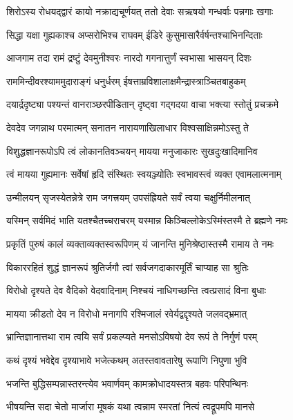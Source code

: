 \twolineshloka
{शिरोऽस्य रोधयद्द्वारं कायो नक्राद्यचूर्णयत्}
{ततो देवाः सऋषयो गन्धर्वाः पन्नगाः खगाः} %

\twolineshloka
{सिद्धा यक्षा गुह्यकाश्च अप्सरोभिश्च राघवम्}
{ईडिरे कुसुमासारैर्वर्षन्तश्चाभिनन्दिताः} %

\twolineshloka
{आजगाम तदा रामं द्रष्टुं देवमुनीश्वरः}
{नारदो गगनात्तुर्णं स्वभासा भासयन् दिशः} %

\twolineshloka
{राममिन्दीवरश्याममुदाराङ्गं धनुर्धरम्}
{ईषत्ताम्रविशालाक्षमैन्द्रास्त्राञ्चितबाहुकम्} %

\twolineshloka
{दयार्द्रदृष्ट्या पश्यन्तं वानराञ्छरपीडितान्}
{दृष्ट्वा गद्गदया वाचा भक्त्या स्तोतुं प्रचक्रमे} %


\twolineshloka
{देवदेव जगन्नाथ परमात्मन् सनातन}
{नारायणाखिलाधार विश्वसाक्षिन्नमोऽस्तु ते} %

\twolineshloka
{विशुद्धज्ञानरूपोऽपि त्वं लोकानतिवञ्चयन्}
{मायया मनुजाकारः सुखदुःखादिमानिव} %

\twolineshloka
{त्वं मायया गुह्यमानः सर्वेषां हृदि संस्थितः}
{स्वयञ्ज्योतिः स्वभावस्त्वं व्यक्त एवामलात्मनाम्} %

\twolineshloka
{उन्मीलयन् सृजस्येतन्नेत्रे राम जगत्त्रयम्}
{उपसंह्रियते सर्वं त्वया चक्षुर्निमीलनात्} %

\twolineshloka
{यस्मिन् सर्वमिदं भाति यतश्चैतच्चराचरम्}
{यस्मान्न किञ्चिल्लोकेऽस्मिंस्तस्मै ते ब्रह्मणे नमः} %

\twolineshloka
{प्रकृतिं पुरुषं कालं व्यक्ताव्यक्तस्वरूपिणम्}
{यं जानन्ति मुनिश्रेष्ठास्तस्मै रामाय ते नमः} %

\twolineshloka
{विकाररहितं शुद्धं ज्ञानरूपं श्रुतिर्जगौ}
{त्वां सर्वजगदाकारमूर्तिं चाप्याह सा श्रुतिः} %

\twolineshloka
{विरोधो दृश्यते देव वैदिको वेदवादिनाम्}
{निश्चयं नाधिगच्छन्ति त्वत्प्रसादं विना बुधाः} %

\twolineshloka
{मायया क्रीडतो देव न विरोधो मनागपि}
{रश्मिजालं रवेर्यद्वद्दृश्यते जलवद्\mbox{}भ्रमात्} %

\twolineshloka
{भ्रान्तिज्ञानात्तथा राम त्वयि सर्वं प्रकल्प्यते}
{मनसोऽविषयो देव रूपं ते निर्गुणं परम्} %

\twolineshloka
{कथं दृश्यं भवेद्देव दृश्याभावे भजेत्कथम्}
{अतस्तवावतारेषु रूपाणि निपुणा भुवि} %

\twolineshloka
{भजन्ति बुद्धिसम्पन्नास्तरन्त्येव भवार्णवम्}
{कामक्रोधादयस्तत्र बहवः परिपन्थिनः} %

\twolineshloka
{भीषयन्ति सदा चेतो मार्जारा मूषकं यथा}
{त्वन्नाम स्मरतां नित्यं त्वद्रूपमपि मानसे} %

